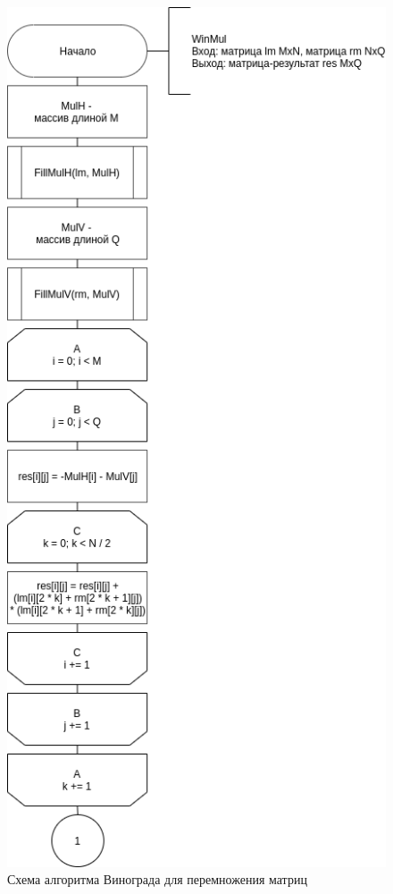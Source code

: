\begin{figure}[h]
	\centering
	\includegraphics[scale=0.65]{schemes/win-top}
	\caption{Схема алгоритма Винограда для перемножения матриц}
	\label{scheme:win-top}
\end{figure}


